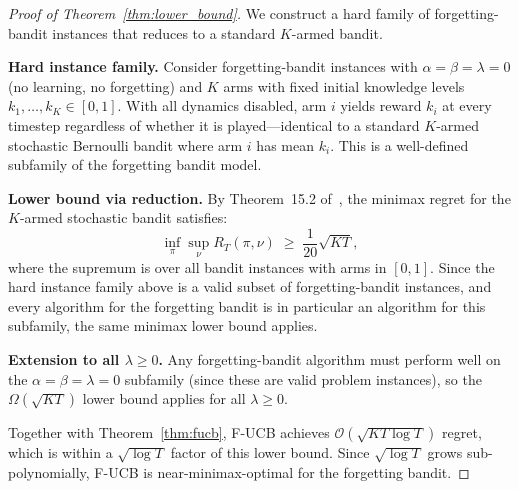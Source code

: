 \begin{proof}[Proof of Theorem~\ref{thm:lower_bound}]
We construct a hard family of forgetting-bandit instances that reduces to a standard $K$-armed bandit.

\textbf{Hard instance family.}
Consider forgetting-bandit instances with $\alpha = \beta = \lambda = 0$ (no learning, no forgetting) and $K$ arms with fixed initial knowledge levels $k_1, \ldots, k_K \in [0,1]$.
With all dynamics disabled, arm $i$ yields reward $k_i$ at every timestep regardless of whether it is played---identical to a standard $K$-armed stochastic Bernoulli bandit where arm $i$ has mean $k_i$.
This is a well-defined subfamily of the forgetting bandit model.

\textbf{Lower bound via reduction.}
By Theorem~15.2 of~\citet{lattimore2020bandit}, the minimax regret for the $K$-armed stochastic bandit satisfies:
\[
\inf_\pi \sup_\nu R_T(\pi, \nu) \;\geq\; \frac{1}{20}\sqrt{KT},
\]
where the supremum is over all bandit instances with arms in $[0,1]$.
Since the hard instance family above is a valid subset of forgetting-bandit instances, and every algorithm for the forgetting bandit is in particular an algorithm for this subfamily, the same minimax lower bound applies.

\textbf{Extension to all $\lambda \geq 0$.}
Any forgetting-bandit algorithm must perform well on the $\alpha{=}\beta{=}\lambda{=}0$ subfamily (since these are valid problem instances), so the $\Omega(\sqrt{KT})$ lower bound applies for all $\lambda \geq 0$.

Together with Theorem~\ref{thm:fucb}, F-UCB achieves $\mathcal{O}(\sqrt{KT\log T})$ regret, which is within a $\sqrt{\log T}$ factor of this lower bound. Since $\sqrt{\log T}$ grows sub-polynomially, F-UCB is near-minimax-optimal for the forgetting bandit.
\end{proof}

